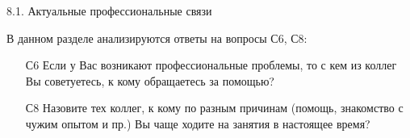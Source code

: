 \begin{frame}{8.1. Актуальные профессиональные связи }

\tiny

В данном разделе анализируются ответы на вопросы С6, С8:
\bigskip

\begin{itemize}

\item [С6] Если у Вас возникают профессиональные проблемы, то с кем из коллег Вы советуетесь, к кому обращаетесь за помощью?

\item [С8] Назовите тех коллег, к кому по разным причинам (помощь, знакомство с чужим опытом и пр.) Вы чаще ходите на занятия в настоящее время?

\end{itemize}

\end{frame}


